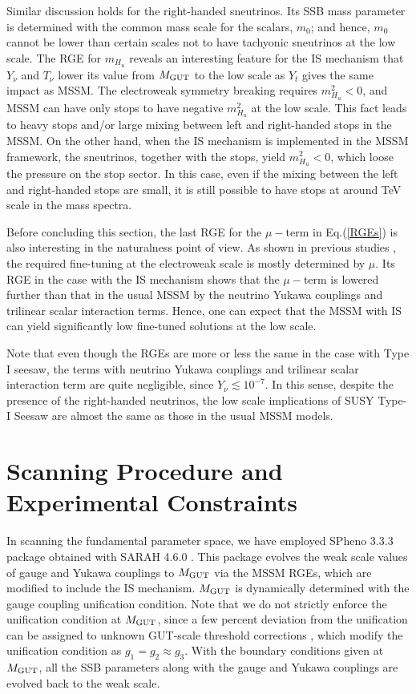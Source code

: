 \documentclass[12pt]{article}
\newcommand{\mgut}{M_{{\rm GUT}}}
\begin{document}
Similar discussion holds for the right-handed sneutrinos. Its SSB mass parameter is determined with the common mass scale for the scalars, $m_{0}$; and hence, $m_{0}$ cannot be lower than certain scales not to have tachyonic sneutrinos at the low scale. The RGE for $m_{H_{u}}$ reveals an interesting feature for the IS mechanism that $Y_{\nu}$ and $T_{\nu}$ lower its value from $\mgut$ to the low scale as $Y_{t}$ gives the same impact as MSSM. The electroweak symmetry breaking requires $m_{H_{u}}^{2} < 0$, and MSSM can have only stops to have negative $m_{H_{u}}^{2}$ at the low scale. This fact leads to heavy stops and/or large mixing between left and right-handed stops in the MSSM. On the other hand, when the IS mechanism is implemented in the MSSM framework, the sneutrinos, together with the stops, yield $m_{H_{u}}^{2} < 0$, which loose the pressure on the stop sector. In this case, even if the mixing between the left and right-handed stops are small, it is still possible to have stops at around TeV scale in the mass spectra. 

Before concluding this section, the last RGE for the $\mu-$term in Eq.(\ref{RGEs}) is also interesting in the naturalness point of view. As shown in previous studies \cite{Baer:2012mv}, the required fine-tuning at the electroweak scale is mostly determined by $\mu$. Its RGE in the case with the IS mechanism shows that the $\mu-$term is lowered further than that in the usual MSSM by the neutrino Yukawa couplings and trilinear scalar interaction terms. Hence, one can expect that the MSSM with IS can yield significantly low fine-tuned solutions at the low scale. 

Note that even though the RGEs are more or less the same in the case with Type I seesaw, the terms with neutrino Yukawa couplings and trilinear scalar interaction term are quite negligible, since $Y_{\nu}\lesssim 10^{-7}$. In this sense, despite the presence of the right-handed neutrinos, the low scale implications of SUSY Type-I Seesaw are almost the same as those in the usual MSSM models.




\section{Scanning Procedure and Experimental Constraints}
 \label{sec:scan}

In scanning the fundamental parameter space, we have employed SPheno 3.3.3 package \cite{Porod:2003um} obtained with SARAH 4.6.0 \cite{Staub:2008uz}. This package evolves the weak scale values of gauge and Yukawa couplings to $\mgut$ via the MSSM RGEs, which are modified to include the IS mechanism. $\mgut$ is dynamically determined with the gauge coupling unification condition. Note that we do not strictly  enforce the unification condition at $\mgut$, since a few percent deviation from the unification can be assigned to unknown GUT-scale threshold corrections \cite{Hisano:1992jj}, which modify the unification condition as $g_{1}=g_{2}\approx g_{3}$. With the boundary conditions given at $M_{{\rm GUT}}$, all the SSB parameters along with the gauge and Yukawa couplings are evolved back to the weak scale.
\end{document}
